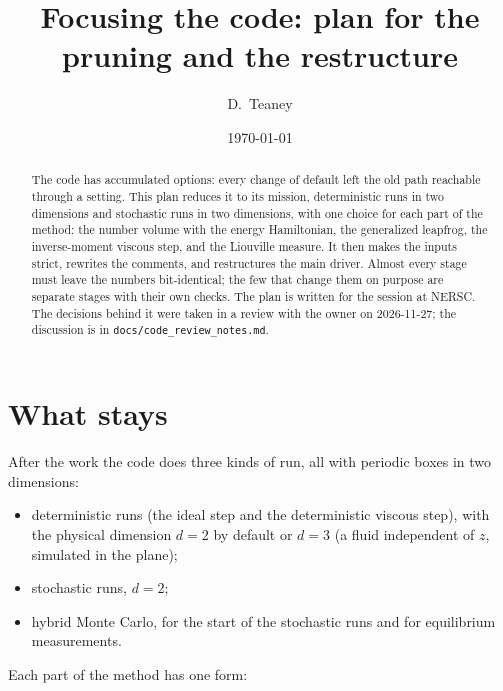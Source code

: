 \documentclass[11pt,aps,preprint,nofootinbib,superscriptaddress,tightenlines]{revtex4-2}
\begin{document}
\sloppy

\title{Focusing the code: plan for the pruning and the restructure}
\author{D.~Teaney}
\date{\today}

\begin{abstract}
The code has accumulated options: every change of default left the old path reachable through a setting.  This plan reduces it to its
mission, deterministic runs in two dimensions and stochastic runs in two dimensions, with one choice for each part of the method: the
number volume with the energy Hamiltonian, the generalized leapfrog, the inverse-moment viscous step, and the Liouville measure.  It then
makes the inputs strict, rewrites the comments, and restructures the main driver.  Almost every stage must leave the numbers bit-identical; the
few that change them on purpose are separate stages with their own checks.  The plan is written for the session at NERSC.  The decisions
behind it were taken in a review with the owner on 2026-11-27; the discussion is in \nolinkurl{docs/code_review_notes.md}.
\end{abstract}

\maketitle
\tableofcontents

\section{What stays}
\label{sec:stays}

After the work the code does three kinds of run, all with periodic boxes in two dimensions:
\begin{itemize}
\item deterministic runs (the ideal step and the deterministic viscous step), with the physical dimension $d=2$ by default or $d=3$ (a fluid
  independent of $z$, simulated in the plane);
\item stochastic runs, $d=2$;
\item hybrid Monte Carlo, for the start of the stochastic runs and for equilibrium measurements.
\end{itemize}
Each part of the method has one form:
\end{document}
